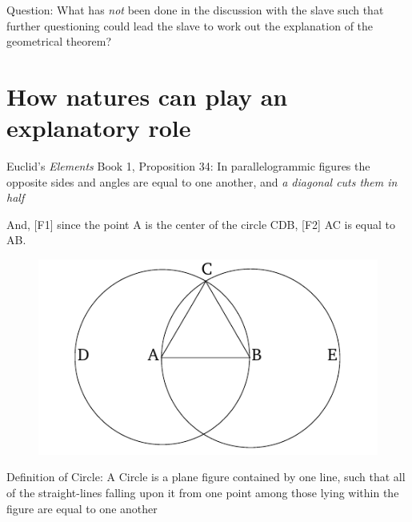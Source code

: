 \documentclass[10 pt]{article}
\begin{document}
\noindent Question: What has \emph{not} been done in the discussion with the slave such that further questioning could lead the slave to work out the explanation of the geometrical theorem?
\vspace*{2mm}

\section*{How natures can play an explanatory role}

\noindent Euclid's \emph{Elements} Book 1, Proposition 34: In parallelogrammic figures the opposite sides and angles are equal to one another, and \emph{a diagonal cuts them in half}
\vspace*{2mm}

\noindent And, [F1] since the point A is the center of the circle CDB, [F2] AC is equal to AB.

\begin{figure}[h!]
\centering
\includegraphics[scale=0.7]{circle}
\end{figure}

\noindent Definition of Circle: A Circle is a plane figure contained by one line, such that all of the straight-lines falling upon it from one point among those lying within the figure are equal to one another
\end{document}
